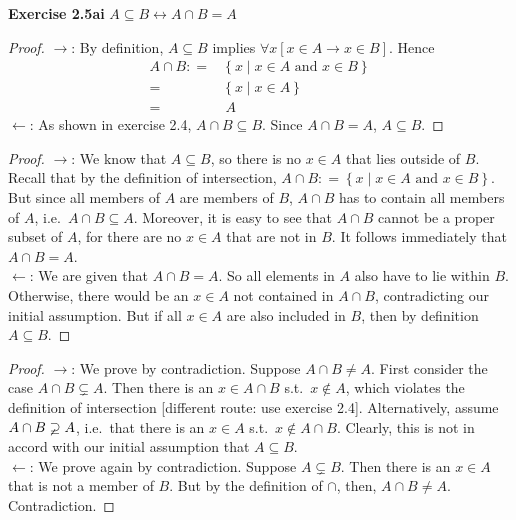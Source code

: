 \documentclass[letterpaper,12pt]{article}
\author{\theauthor}
\title{\thetitle}
\date{\thedate}
\newcommand{\is}{\ensuremath{\mathrel{\mathop:}=}}
\newcommand{\setof}[1]{\ensuremath{\left \{ #1 \right \}}}
\newcommand{\exercise}[1]{\noindent \textbf{Exercise #1} \quad}
\begin{document}
\maketitle
\doublespacing

\exercise{2.5ai} $A \subseteq B \leftrightarrow A \cap B = A$
\begin{proof}
	$\rightarrow$: By definition, $A \subseteq B$ implies $\forall x [ x \in A \rightarrow x \in B]$. Hence
	\begin{align*}
		A \cap B \is& \setof{x \mid x \in A \text{ and } x \in B}\\
			=& \setof{x \mid x \in A}\\
			=&\ A
	\end{align*}
	$\leftarrow$: As shown in exercise 2.4, $A \cap B \subseteq B$. Since $A \cap B = A$, $A \subseteq B$.
\end{proof}
%
\begin{proof}
	$\rightarrow$: We know that $A \subseteq B$, so there is no $x \in A$ that lies outside of $B$. Recall that by the definition of intersection, $A \cap B \is \setof{ x \mid x \in A \text { and } x \in B}$. But since all members of $A$ are members of $B$, $A \cap B$ has to contain all members of $A$, i.e.\ $A \cap B \subseteq A$. Moreover, it is easy to see that $A \cap B$ cannot be a proper subset of $A$, for there are no $x \in A$ that are not in $B$. It follows immediately that $A \cap B = A$.\\
	$\leftarrow$: We are given that $A \cap B = A$. So all elements in $A$ also have to lie within $B$. Otherwise, there would be an $x \in A$ not contained in $A \cap B$, contradicting our initial assumption. But if all $x \in A$ are also included in $B$, then by definition $A \subseteq B$.
\end{proof}
%
\begin{proof}
	$\rightarrow$: We prove by contradiction. Suppose $A \cap B \neq A$. First consider the case $A \cap B \varsubsetneq A$. Then there is an $x \in A \cap B$ s.t.\ $x \notin A$, which violates the definition of intersection [different route: use exercise 2.4]. Alternatively, assume $A \cap B \varsupsetneq A$, i.e.\ that there is an $x \in A$ s.t.\ $x \notin A \cap B$. Clearly, this is not in accord with our initial assumption that $A \subseteq B$.\\
	$\leftarrow$: We prove again by contradiction. Suppose $A \varsubsetneq B$. Then there is an $x \in A$ that is not a member of $B$. But by the definition of $\cap$, then, $A \cap B \neq A$. Contradiction.
\end{proof}
\end{document}
